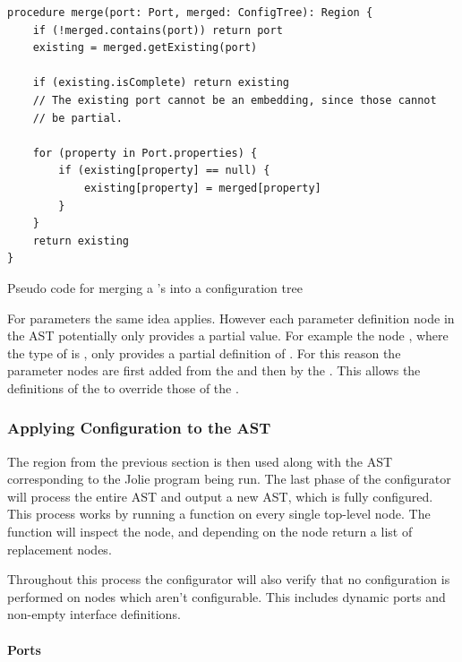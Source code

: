 \begin{listing}[H]
\begin{verbatim}
procedure merge(port: Port, merged: ConfigTree): Region {
    if (!merged.contains(port)) return port
    existing = merged.getExisting(port)

    if (existing.isComplete) return existing
    // The existing port cannot be an embedding, since those cannot
    // be partial.

    for (property in Port.properties) {
        if (existing[property] == null) {
            existing[property] = merged[property]
        }
    }
    return existing
}
\end{verbatim}

\caption{Pseudo code for merging a 's  into a
     configuration tree}

\label{lst:merge_ports}

\end{listing}

For parameters the same idea applies. However each parameter definition node in
the AST potentially only provides a partial value. For example the node
, where the type of  is , only provides a partial definition of . For this
reason the parameter nodes are first added from the  and then by
the . This allows the definitions of the  to override
those of the .

\subsubsection*{Applying Configuration to the AST}

The  region from the previous section is then used along
with the AST corresponding to the Jolie program being run. The last phase of
the configurator will process the entire AST and output a new AST, which is
fully configured. This process works by running a  function on
every single top-level node. The  function will inspect the node,
and depending on the node return a list of replacement nodes.

Throughout this process the configurator will also verify that no configuration
is performed on nodes which aren't configurable. This includes dynamic ports
and non-empty interface definitions.

\paragraph{Ports}

